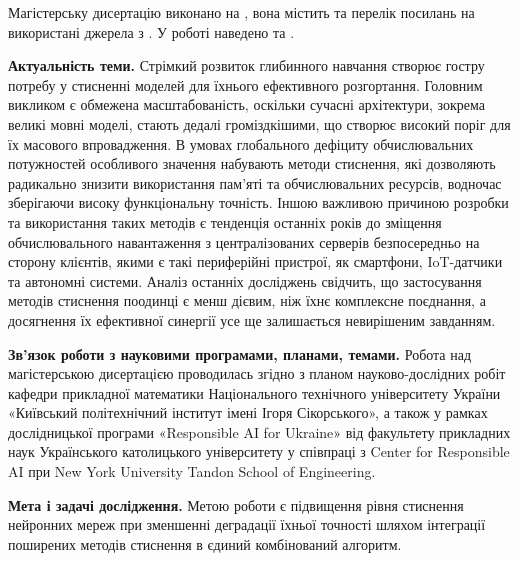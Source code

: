 \documentclass{pma-mthesis}
\begin{document}
\pagestyle{empty}

Магістерську дисертацію виконано на , вона містить  та перелік посилань на використані джерела з . У роботі наведено  та .

\textbf{Актуальність теми.} Стрімкий розвиток глибинного навчання створює гостру потребу у стисненні моделей для їхнього ефективного розгортання. Головним викликом є обмежена масштабованість, оскільки сучасні архітектури, зокрема великі мовні моделі, стають дедалі громіздкішими, що створює високий поріг для їх масового впровадження. В умовах глобального дефіциту обчислювальних потужностей особливого значення набувають методи стиснення, які дозволяють радикально знизити використання пам’яті та обчислювальних ресурсів, водночас зберігаючи високу функціональну точність. Іншою важливою причиною розробки та використання таких методів є тенденція останніх років до зміщення обчислювального навантаження з централізованих серверів безпосередньо на сторону клієнтів, якими є такі периферійні пристрої, як смартфони, IoT-датчики та автономні системи. Аналіз останніх досліджень свідчить, що застосування методів стиснення поодинці є менш дієвим, ніж їхнє комплексне поєднання, а досягнення їх ефективної синергії усе ще залишається невирішеним завданням.

\textbf{Зв’язок роботи з науковими програмами, планами, темами.} Робота над магістерською дисертацією проводилась згідно з планом науково-дослідних робіт кафедри прикладної математики Національного технічного університету України «Київський політехнічний інститут імені Ігоря Сікорського», а також у рамках дослідницької програми «Responsible AI for Ukraine» від факультету прикладних наук Українського католицького університету у співпраці з Center for Responsible AI при New York University Tandon School of Engineering. 

\textbf{Мета і задачі дослідження.} Метою роботи є підвищення рівня стиснення нейронних мереж при зменшенні деградації їхньої точності шляхом інтеграції поширених методів стиснення в єдиний комбінований алгоритм.
\end{document}

